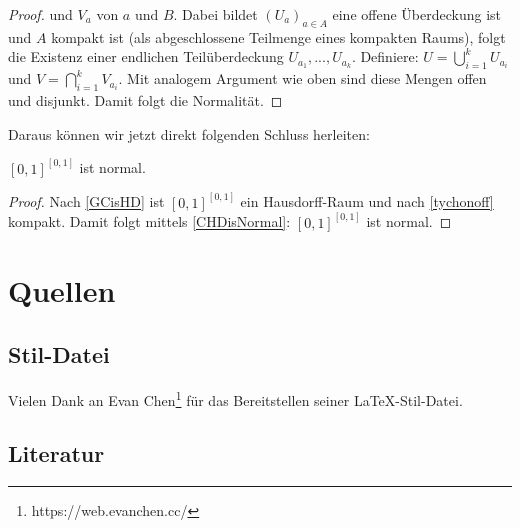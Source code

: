 \documentclass[11pt]{scrartcl}
\begin{document}
{\begin{proof}
	und $V_a$ von $a$ und $B$. Dabei bildet $(U_a)_{a\in A}$ eine offene Überdeckung ist und $A$ kompakt ist (als abgeschlossene Teilmenge eines kompakten Raums), folgt die Existenz einer endlichen
	Teilüberdeckung $U_{a_1},...,U_{a_k}$. Definiere: $U= \bigcup_{i=1}^k U_{a_i}$ und $V= \bigcap_{i=1}^k V_{a_i}$. Mit analogem Argument wie oben sind diese Mengen offen und disjunkt. Damit folgt die
	Normalität.
\end{proof}
Daraus können wir jetzt direkt folgenden Schluss herleiten:
\begin{theorem}
	$[0,1]^{[0,1]}$ ist normal.
\end{theorem}
\begin{proof}
	Nach \ref{GCisHD} ist $[0,1]^{[0,1]}$ ein Hausdorff-Raum und nach \ref{tychonoff} kompakt. Damit folgt mittels \ref{CHDisNormal}: $[0,1]^{[0,1]}$ ist normal.
\end{proof}
}
\section{Quellen}
\subsection{Stil-Datei}
Vielen Dank an Evan Chen\footnote{https://web.evanchen.cc/} für das Bereitstellen seiner \LaTeX-Stil-Datei.
\subsection{Literatur}
\printbibliography[heading=none]
\end{document}
